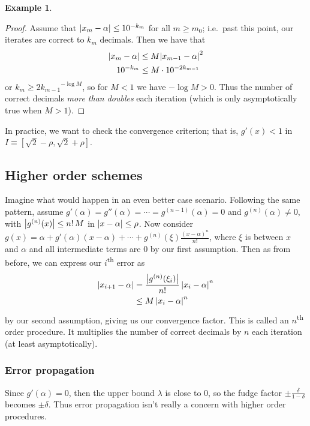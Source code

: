 \documentclass[12pt,letterpaper,DIV=11]{scrartcl}
\theoremstyle{plain}
\theoremstyle{definition}
\newtheorem{example}{Example}[section]
\theoremstyle{remark}
\begin{document}
\begin{example}
  \begin{proof}
    Assume that $\left\lvert x_m - \alpha\right\rvert \leq 10^{-k_m}$ for all $m \geq m_0$; i.e.\ past this point, our iterates are correct to $k_m$ decimals.
    Then we have that \begin{align*}
      \left\lvert x_m - \alpha\right\rvert &\leq M {\left\vert x_{m - 1} - \alpha \right\vert}^2 \\
      10^{-k_m} &\leq M \cdot 10^{-2k_{m - 1}}
    \end{align*} or $k_m \geq {2 k_{m - 1}}^{-\log M}$,
    so for $M < 1$ we have $-\log M > 0$.
    Thus the number of correct decimals \emph{more than doubles} each iteration (which is only asymptotically true when $M > 1$).
  \end{proof}

  In practice, we want to check the convergence criterion; that is, $g'(x) < 1$ in $I \equiv [\sqrt{2} - \rho, \sqrt{2} + \rho]$.
\end{example}

\subsection{Higher order schemes}
Imagine what would happen in an even better case scenario.
Following the same pattern, assume $g'(\alpha) = g''(\alpha) = \cdots = g^{(n - 1)}(\alpha) = 0$ and $g^{(n)}(\alpha) \neq 0$, with $\left\lvert g^{(n)}(x)\right\rvert \leq n!\, M$
in $\left\lvert x - \alpha\right\rvert \leq \rho$.
Now consider $g(x) = \alpha + g'(\alpha)(x - \alpha) + \cdots + g^{(n)}(\xi) \frac{{(x - \alpha)}^n}{n!}$, where $\xi$ is between $x$ and $\alpha$ and all intermediate terms are 0 by our first assumption.
Then as from before, we can express our $i$\textsuperscript{th} error as \begin{align*}
  \left\lvert x_{i + 1} - \alpha\right\rvert &= \frac{\left\lvert g^{(n)}(\xi_i)\right\rvert}{n!} \left\lvert x_i - \alpha\right\rvert^n \\
                           &\leq M \left\lvert x_i - \alpha\right\rvert^n
\end{align*} by our second assumption, giving us our convergence factor.
This is called an $n$\textsuperscript{th} order procedure.
It multiplies the number of correct decimals by $n$ each iteration (at least asymptotically).

\subsubsection{Error propagation}
Since $g'(\alpha) = 0$, then the upper bound $\lambda$ is close to 0, so the fudge factor $\pm \frac{\delta}{1 - \delta}$ becomes $\pm \delta$.
Thus error propagation isn't really a concern with higher order procedures.
\end{document}
